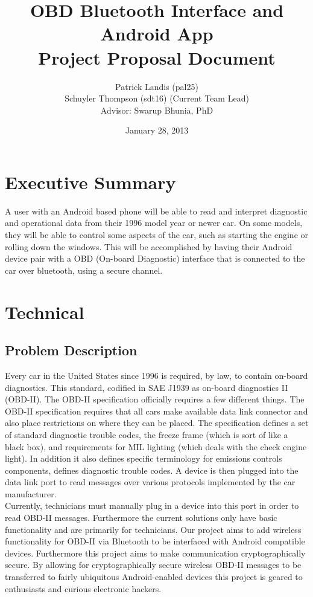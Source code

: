 \documentclass[12pt,letterpaper]{article}
\title{
\textbf{\LARGE OBD Bluetooth Interface and Android App} \\
\Large Project Proposal Document
}
\author{
\normalsize Patrick Landis (pal25) \\
\normalsize Schuyler Thompson (sdt16) (Current Team Lead) \\
\normalsize Advisor: Swarup Bhunia, PhD
}
\date{\normalsize January 28, 2013}
\begin{document}
\maketitle
\newpage

\section*{Executive Summary}
A user with an Android based phone will be able to read and interpret diagnostic and operational data from their 1996 model year or newer car. On some models, they will be able to control some aspects of the car, such as starting the engine or rolling down the windows. This will be accomplished by having their Android device pair with a OBD (On-board Diagnostic) interface that is connected to the car over bluetooth, using a secure channel. 

\newpage

\section{Technical}
\subsection{Problem Description}
Every car in the United States since 1996 is required, by law, to contain on-board diagnostics. This standard, codified in SAE J1939 as on-board diagnostics II (OBD-II). The OBD-II specification officially requires a few different things. The OBD-II specification requires that all cars make available data link connector and also place restrictions on where they can be placed. The specification defines a set of standard diagnostic trouble codes, the freeze frame (which is sort of like a black box), and requirements for MIL lighting (which deals with the check engine light). In addition it also defines specific terminology for emissions controls components, defines diagnostic trouble codes. A device is then plugged into the data link port to read messages over various protocols implemented by the car manufacturer. \\

Currently, technicians must manually plug in a device into this port in order to read OBD-II messages. Furthermore the current solutions only have basic functionality and are primarily for technicians. Our project aims to add wireless functionality for OBD-II via Bluetooth to be interfaced with Android compatible devices. Furthermore this project aims to make communication cryptographically secure. By allowing for cryptographically secure wireless OBD-II messages to be transferred to fairly ubiquitous Android-enabled devices this project is geared to enthusiasts and curious electronic hackers.
\end{document}
